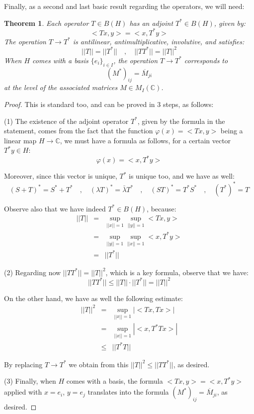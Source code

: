 \documentclass[12pt]{amsbook}
\newtheorem{theorem}{Theorem}[chapter]
\begin{document}
Finally, as a second and last basic result regarding the operators, we will need:


\begin{theorem}
Each operator $T\in B(H)$ has an adjoint $T^*\in B(H)$, given by: 
$$<Tx,y>=<x,T^*y>$$
The operation $T\to T^*$ is antilinear, antimultiplicative, involutive, and satisfies:
$$||T||=||T^*||\quad,\quad ||TT^*||=||T||^2$$
When $H$ comes with a basis $\{e_i\}_{i\in I}$, the operation $T\to T^*$ corresponds to
$$(M^*)_{ij}=\overline{M}_{ji}$$ 
at the level of the associated matrices $M\in M_I(\mathbb C)$.
\end{theorem}

\begin{proof}
This is standard too, and can be proved in 3 steps, as follows:

\medskip

(1) The existence of the adjoint operator $T^*$, given by the formula in the statement, comes from the fact that the function $\varphi(x)=<Tx,y>$ being a linear map $H\to\mathbb C$, we must have a formula as follows, for a certain vector $T^*y\in H$:
$$\varphi(x)=<x,T^*y>$$

Moreover, since this vector is unique, $T^*$ is unique too, and we have as well:
$$(S+T)^*=S^*+T^*\quad,\quad
(\lambda T)^*=\bar{\lambda}T^*\quad,\quad 
(ST)^*=T^*S^*\quad,\quad 
(T^*)^*=T$$

Observe also that we have indeed $T^*\in B(H)$, because:
\begin{eqnarray*}
||T||
&=&\sup_{||x||=1}\sup_{||y||=1}<Tx,y>\\
&=&\sup_{||y||=1}\sup_{||x||=1}<x,T^*y>\\
&=&||T^*||
\end{eqnarray*}

(2) Regarding now $||TT^*||=||T||^2$, which is a key formula, observe that we have:
$$||TT^*||
\leq||T||\cdot||T^*||
=||T||^2$$

On the other hand, we have as well the following estimate:
\begin{eqnarray*}
||T||^2
&=&\sup_{||x||=1}|<Tx,Tx>|\\
&=&\sup_{||x||=1}|<x,T^*Tx>|\\
&\leq&||T^*T||
\end{eqnarray*}

By replacing $T\to T^*$ we obtain from this $||T||^2\leq||TT^*||$, as desired.

\medskip

(3) Finally, when $H$ comes with a basis, the formula $<Tx,y>=<x,T^*y>$ applied with $x=e_i$, $y=e_j$ translates into the formula $(M^*)_{ij}=\overline{M}_{ji}$, as desired.
\end{proof}
\end{document}
